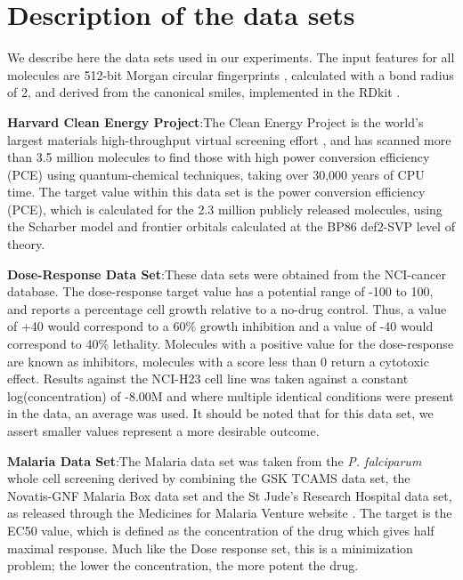 \section{Description of the data sets}

We describe here the data sets used in our experiments. The input features for all molecules are 512-bit Morgan circular fingerprints \cite{Rogers_2010}, calculated with a bond radius of 2, and derived from the canonical smiles, implemented in the RDkit \cite{rdkit}.

\textbf{Harvard Clean Energy Project}:The Clean Energy Project is the world's largest materials high-throughput virtual screening effort \cite{Hachmann_2014,Hachmann_2011}, and has scanned more than 3.5 million molecules to find those with high power conversion efficiency (PCE) using quantum-chemical techniques, taking over 30,000 years of CPU time. The target value within this data set is the power conversion efficiency (PCE), which is calculated for the 2.3 million publicly released molecules, using the Scharber model \cite{Dennler_2008} and frontier orbitals calculated at the BP86 \cite{Perdew_1986,Becke_1993} \/ def2-SVP \cite{Weigend_2005} level of theory.


\textbf{Dose-Response Data Set}:These data sets were obtained from the NCI-cancer database\cite{_nci_}.  The dose-response target value has a potential range of -100 to 100, and reports a percentage cell growth relative to a no-drug control.  Thus, a value of +40 would correspond to a 60\% growth inhibition and a value of -40 would correspond to 40\% lethality.  Molecules with a positive value for the dose-response are known as inhibitors, molecules with a score less than 0 return a cytotoxic effect. Results against the NCI-H23 cell line was taken against a constant log(concentration) of -8.00M and where multiple identical conditions were present in the data, an average was used.  It should be noted that for this data set, we assert smaller values represent a more desirable outcome. 


\textbf{Malaria Data Set}:The Malaria data set was taken from the \textit{P. falciparum} whole cell screening derived by combining the GSK TCAMS data set, the Novatis-GNF Malaria Box data set and the St Jude's Research Hospital data set, as released through the Medicines for Malaria Venture website \cite{23798988}.  The target is the EC50 value, which is defined as the concentration of the drug which gives half maximal response.  Much like the Dose response set, this is a minimization problem; the lower the concentration, the more potent the drug.
